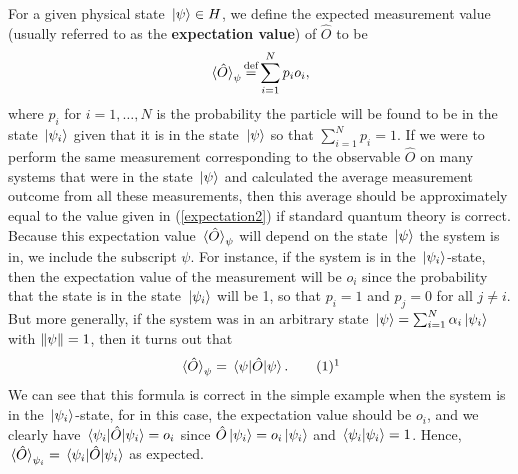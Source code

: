 For a given physical state $\ket*{\psi}\in H$, we define the expected measurement value (usually referred to as the \textbf{expectation value}) of $\hat{O}$ to be 
\begin{equation}\label{expectation2}
\ev*{\hat{O}}_\psi\myeq\sum_{i=1}^N p_io_i,
\end{equation}
where %
%
$p_i$  %
%
for $i=1,\ldots, N$ is the probability the particle will be found to be in the state $\ket*{\psi_i}$ given that it is in the state $\ket*{\psi}$ so that  $\sum_{i=1}^N p_i=1$. If we were to perform the same measurement corresponding to the observable $\hat{O}$ on many systems that were in the state $\ket*{\psi}$ and calculated the average measurement outcome from all these measurements, then this average should be approximately equal to the value given in (\ref{expectation2}) if  standard quantum theory is correct. Because this expectation value $\ev*{\hat{O}}_\psi$ will depend on the state $\ket*{\psi}$ the system is in, we include the subscript $\psi$. For instance, if the system is in the $\ket*{\psi_i}$-state, then the expectation value of the measurement will be $o_i$ since the probability that the state is in the state $\ket*{\psi_i}$ will be 1, so that $p_i=1$ and $p_j=0$ for all $j\neq i$. But more generally, if the system was in an arbitrary state $\ket*{\psi}=\sum_{i=1}^N \alpha_i\ket*{\psi_i}$ with $\norm{\psi}=1$, then it turns out that 
\begin{equation}\refstepcounter{equation}\label{evev}\ev*{\hat{O}}_\psi=\ev*{\hat{O}}{\psi}.\tag{\theequation}\protect\footnotemark
\end{equation}We can see that this formula is correct in the simple example when the system is in the $\ket*{\psi_i}$-state, for in this case, the expectation value should be $o_i$, and we clearly have $\ev*{\hat{O}}{\psi_i}=o_i$ since $\hat{O}\ket*{\psi_i}=o_i\ket*{\psi_i}$ and $\ip*{\psi_i}=1$. Hence, $\ev*{\hat{O}}_{\psi_i}=\ev*{\hat{O}}{\psi_i}$ as expected.

